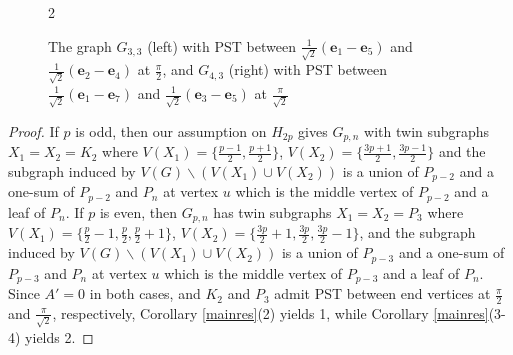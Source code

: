 \documentclass[12pt,a4paper]{article}
\def \e {{\bf e}}
\def \e {{\mathbf e}}
\begin{document}
\begin{figure}[h!]
\begin{multicols}{2}
\begin{center}
\end{center}
\end{multicols}
\caption{The graph $G_{3,3}$ (left) with PST between $\frac{1}{\sqrt2}(\e_1-\e_5)$ and $\frac{1}{\sqrt2}(\e_2-\e_4)$ at $\frac{\pi}{2}$, and $G_{4,3}$ (right) with PST between $\frac{1}{\sqrt2}(\e_1-\e_7)$ and $\frac{1}{\sqrt2}(\e_3-\e_5)$ at $\frac{\pi}{\sqrt{2}}$}\label{yay6}
\end{figure}

\begin{proof}
If $p$ is odd, then our assumption on $H_{2p}$ gives $G_{p,n}$ with twin subgraphs $X_1=X_2=K_2$ where $V(X_1)=\{\frac{p-1}{2},\frac{p+1}{2}\}$, $V(X_2)=\{\frac{3p+1}{2},\frac{3p-1}{2}\}$ and the subgraph induced by $V(G)\backslash (V(X_1)\cup V(X_2))$ is a union of $P_{p-2}$ and a one-sum of $P_{p-2}$ and $P_n$ at vertex $u$ which is the middle vertex of $P_{p-2}$ and a leaf of $P_n$. If $p$ is even, then $G_{p,n}$ has twin subgraphs $X_1=X_2=P_3$ where $V(X_1)=\{\frac{p}{2}-1,\frac{p}{2},\frac{p}{2}+1\}$, $V(X_2)=\{\frac{3p}{2}+1,\frac{3p}{2},\frac{3p}{2}-1\}$, and the subgraph induced by $V(G)\backslash (V(X_1)\cup V(X_2))$ is a union of $P_{p-3}$ and a one-sum of $P_{p-3}$ and $P_n$ at vertex $u$ which is the middle vertex of $P_{p-3}$ and a leaf of $P_n$. %
Since $A'=0$ in both cases, and $K_2$ and $P_3$ admit PST between end vertices at $\frac{\pi}{2}$ and $\frac{\pi}{\sqrt{2}}$, respectively, Corollary \ref{mainres}(2) yields 1, while Corollary \ref{mainres}(3-4) yields 2.
\end{proof}
\end{document}
